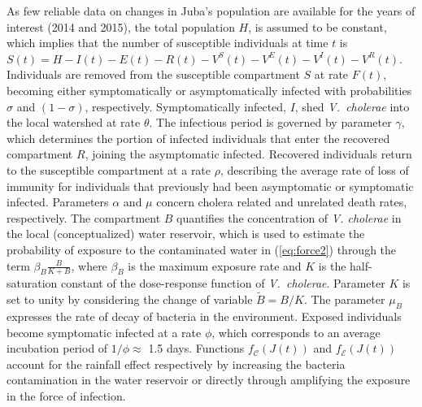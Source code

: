 As few reliable data on changes in Juba's population are available for the years of interest (2014 and 2015), the total population $H$, is assumed to be constant, which implies that the number of susceptible individuals at time $t$ is $S(t) = H - I(t) - E(t) - R(t) - V^S(t) - V^E(t) - V^I(t) - V^R(t)$. Individuals are removed from the susceptible compartment $S$ at rate $F(t)$, becoming either symptomatically or asymptomatically infected with probabilities $\sigma$ and $(1-\sigma)$, respectively. Symptomatically infected, $I$, shed \textit{V.~cholerae} into the local watershed at rate $\theta$. 
The infectious period is governed by parameter $\gamma$, which determines the portion of infected individuals that enter the recovered compartment $R$, joining the asymptomatic infected. Recovered individuals return to the susceptible compartment at a rate $\rho$, describing the average rate of loss of immunity for individuals that previously had been asymptomatic or symptomatic infected. Parameters $\alpha$ and $\mu$ concern cholera related and unrelated death rates, respectively. The compartment $B$ quantifies the concentration of \textit{V. cholerae} in the local (conceptualized) water reservoir, which is used to estimate the probability of exposure to the contaminated water in (\ref{eq:force2}) through the term $\beta_B  \frac{B}{K+B}$, where  $\beta_B$ is the maximum exposure rate and $K$ is the half-saturation constant of the dose-response function of \textit{V.~cholerae}\cite{Codeco:EndemicEpidemicDynamics:2001}. Parameter $K$ is set to unity by considering the change of variable $\tilde{B}=B/K$. The parameter $\mu_B$ expresses the rate of decay of bacteria in the environment. 
Exposed individuals become symptomatic infected at a rate $\phi$, which corresponds to an average incubation period of $1/\phi\approx$ 1.5 days\cite{Azman:IncubationPeriodCholera:2013}.
Functions $f_{\mathcal{C}}\left(J(t)\right)$ and $f_{\mathcal{E}}\left(J(t)\right)$ account for the rainfall effect respectively by increasing the bacteria contamination in the water reservoir or directly through amplifying the exposure in the force of infection.

